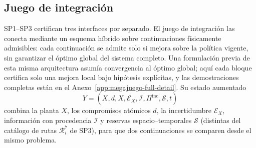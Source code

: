 \clearpage
\subsection{Juego de integración}
\label{subsec:megajuego}

SP1--SP3 certifican tres interfaces por separado. El juego de integración las
conecta mediante un esquema híbrido sobre continuaciones físicamente
admisibles: cada continuación se admite solo si mejora sobre la política
vigente, sin garantizar el óptimo global del sistema
completo. Una formulación previa de esta misma arquitectura asumía
convergencia al óptimo global; aquí cada bloque certifica solo una mejora
local bajo hipótesis explícitas, y las demostraciones completas están en el
Anexo~\ref{app:megajuego-full-detail}. Su estado aumentado
\begin{equation}
 Y=(X,d,\widehat X,\mathcal E_X,\mathcal I,\Pi^{\mathrm{inc}},\mathcal S,t)
 \label{eq:megajuego-state}
\end{equation}
combina la planta $X$, los compromisos atómicos $d$, la incertidumbre
$\mathcal E_X$, información con procedencia $\mathcal I$ y reservas
espacio--temporales $\mathcal S$ (distintas del catálogo de rutas $\mathcal
R_i^7$ de SP3), para que dos continuaciones se comparen desde el mismo
problema.

